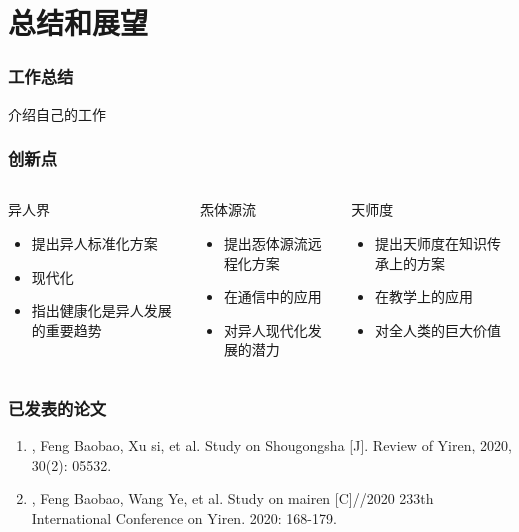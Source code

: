 \documentclass[10pt]{beamer}	%
\newcommand{\Blue}{\bfseries \color{njuPurple}}
\begin{document}
\section{总结和展望}
\begin{frame}
\frametitle{工作总结}
介绍自己的工作
\end{frame}

\begin{frame}
\frametitle{创新点}
\begin{columns}[t]
\begin{column}{0.33\textwidth}
\begin{block}{异人界}
\begin{itemize}
\item 提出异人标准化方案
\item 现代化
\item 指出健康化是异人发展的重要趋势
\end{itemize}
\end{block}
\end{column}
\pause
\begin{column}{0.33\textwidth}
\begin{block}{炁体源流}
\begin{itemize}
\item 提出㤅体源流远程化方案
\item 在通信中的应用
\item 对异人现代化发展的潜力
\end{itemize}
\end{block}
\end{column}
\pause
\begin{column}{0.33\textwidth}
\begin{block}{天师度}
\begin{itemize}
\item 提出天师度在知识传承上的方案
\item 在教学上的应用
\item 对全人类的巨大价值
\end{itemize}
\end{block}
\end{column}
\end{columns}
\end{frame}

\begin{frame}
\frametitle{已发表的论文}
\begin{enumerate}
\item {\Blue{Zhang Chulan}}, Feng Baobao, Xu si, et al. Study on Shougongsha [J]. Review of Yiren, 2020, 30(2): 05532.
\item {\Blue{Zhang Chulan}}, Feng Baobao, Wang Ye, et al. Study on mairen [C]//2020 233th International Conference on Yiren. 2020: 168-179.
\end{enumerate}
\end{frame}
\end{document}
